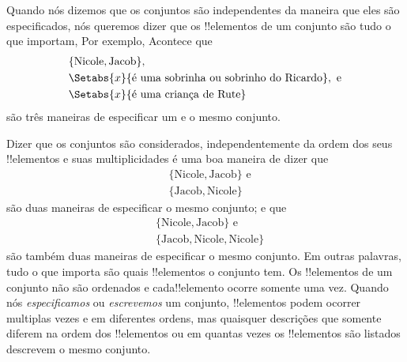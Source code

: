 \documentclass[../../../include/open-logic-section]{subfiles}
\begin{document}
\begin{explain}
Quando nós dizemos que os conjuntos são independentes da maneira
que eles são especificados, nós queremos dizer que os !!{elemento}s de
um conjunto são tudo o que importam, Por exemplo, Acontece que
\begin{align*}
  & \{\text{Nicole}, \text{Jacob}\},\\
  & \Setabs{x}{\text{é uma sobrinha ou sobrinho do Ricardo}}, \text{ e}\\
  & \Setabs{x}{\text{é uma criança de Rute}}
\end{align*}
são três maneiras de especificar um e o mesmo conjunto.


Dizer que os conjuntos são considerados, independentemente da ordem dos seus
!!{elemento}s e suas multiplicidades é uma boa maneira de dizer que
\begin{align*}
  & \{\text{Nicole}, \text{Jacob}\} \text{ e}\\
  & \{\text{Jacob}, \text{Nicole}\}
\end{align*}
são duas maneiras de especificar o mesmo conjunto; e que
\begin{align*}
  & \{\text{Nicole}, \text{Jacob}\} \text{ e}\\
  & \{\text{Jacob}, \text{Nicole}, \text{Nicole}\}
\end{align*}
são também duas maneiras de especificar o mesmo conjunto. Em outras palavras, 
tudo o que importa são quais !!{elemento}s o conjunto tem. Os !!{elemento}s de um
conjunto não são ordenados e cada!!{elemento} ocorre somente uma vez. Quando nós
\emph{especificamos} ou \emph{escrevemos} um conjunto, !!{elemento}s podem ocorrer
multiplas vezes e em diferentes ordens, mas quaisquer descrições que somente
diferem na ordem dos !!{elemento}s ou em quantas vezes os !!{elemento}s são listados
descrevem o mesmo conjunto.
\end{explain}
\end{document}
